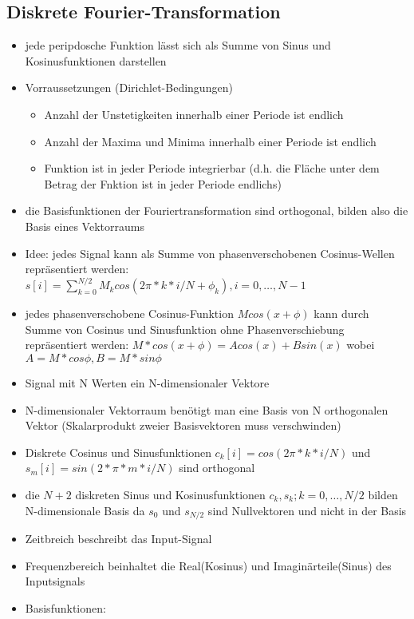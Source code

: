 \documentclass{article} %
\begin{document}
	\subsection{Diskrete Fourier-Transformation}
	\begin{itemize}
		\item jede peripdosche Funktion lässt sich als Summe von Sinus und Kosinusfunktionen darstellen
		\item Vorraussetzungen (Dirichlet-Bedingungen)
		\begin{itemize}
			\item Anzahl der Unstetigkeiten innerhalb einer Periode ist endlich
			\item Anzahl der Maxima und Minima innerhalb einer Periode ist endlich
			\item Funktion ist in jeder Periode integrierbar (d.h. die Fläche unter dem Betrag der Fnktion ist in jeder Periode endlichs)
		\end{itemize}
		\item die Basisfunktionen der Fouriertransformation sind orthogonal, bilden also die Basis eines Vektorraums
		\item Idee: jedes Signal kann als Summe von phasenverschobenen Cosinus-Wellen repräsentiert werden: $s[i] = \sum_{k=0}^{N/2} M_k cos(2\pi*k*i/N+\phi_k), i = 0,\dots,N-1$
		\item jedes phasenverschobene Cosinus-Funktion $M cos(x+\phi)$ kann durch Summe von Cosinus und Sinusfunktion ohne Phasenverschiebung repräsentiert werden: $M*cos(x+\phi) = A cos(x)+B sin(x)$ wobei $A = M*cos \phi, B = M*sin \phi$
		\item Signal mit N Werten ein N-dimensionaler Vektore
		\item N-dimensionaler Vektorraum benötigt man eine Basis von N orthogonalen Vektor (Skalarprodukt zweier Basisvektoren muss verschwinden)
		\item Diskrete Cosinus und Sinusfunktionen $c_k[i] = cos(2\pi*k*i/N)$ und $s_m[i] = sin(2*\pi*m*i/N)$ sind orthogonal
		\item die $N+2$ diskreten Sinus und Kosinusfunktionen $c_k,s_k; k = 0,\dots,N/2$ bilden N-dimensionale Basis da $s_0$ und $s_{N/2}$ sind Nullvektoren und nicht in der Basis
		\item Zeitbreich beschreibt das Input-Signal
		\item Frequenzbereich beinhaltet die Real(Kosinus) und Imaginärteile(Sinus) des Inputsignals
		\item Basisfunktionen:
		\begin{itemize}

\end{itemize}
\end{itemize}
\end{document}
